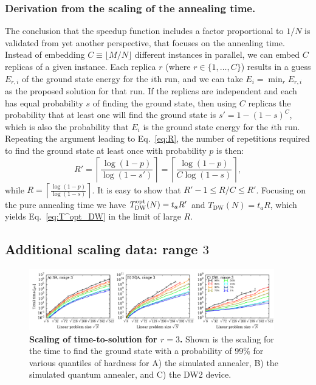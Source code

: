 \subsubsection{Derivation from the scaling of the annealing time.}
The conclusion that the speedup function includes a factor proportional to $1/N$ is validated from yet another perspective, that focuses on the annealing time. Instead of embedding $C\equiv \lfloor{M}/{N}\rfloor$ different instances in parallel, we can embed $C$ replicas of a given instance.
Each replica $r$ (where $r\in\{1,\dots,C\}$) results in a guess $E_{r,i}$ of the ground state energy for the $i$th run, and we can take $E_i = \min_r E_{r,i}$ as the proposed solution for that run.
If the replicas are independent and each has equal probability $s$ of finding the ground state, then
using $C$ replicas the probability that at least one will find the ground state is $s' = 1-(1-s)^C$, which is also the probability that $E_i$ is the ground state energy for the $i$th run. Repeating the argument leading to Eq.~\eqref{eq:R}, the number of repetitions required to find the ground state at least once with probability $p$ is then:
\begin{equation}
  R' =
  \left\lceil
    \frac{\log (1-p)}{\log(1 - s')}
    \right\rceil
    = \left\lceil
    \frac{\log (1-p)}{C\log(1 - s)}\right\rceil ,
\end{equation}
while $R = \left\lceil\frac{\log (1-p)}{\log(1 - s)}\right\rceil$. It is easy to show that $R'-1\leq R/C \leq R'$.
Focusing on the pure annealing time we have $T^{\rm opt}_{\textrm{DW}}(N) = t_a R'$ and $T_{\textrm{DW}}(N) = t_a R$, which yields Eq.~\eqref{eq:T^opt_DW} in the limit of large $R$.\\



\subsection{Additional scaling data: range $3$}
\label{sec:scaling-all-ranges}

\begin{figure}[t]
\centering
\includegraphics[width=0.95\textwidth]{sfigures/sfig04.pdf}
\caption{{\bf Scaling of time-to-solution for $r=3$.} Shown is the scaling for the time to find the ground state with a probability of 99\% for various quantiles of hardness for A) the simulated annealer, B) the simulated quantum annealer, and C) the DW2 device.}
\label{fig:scalingraw3}
\end{figure}

